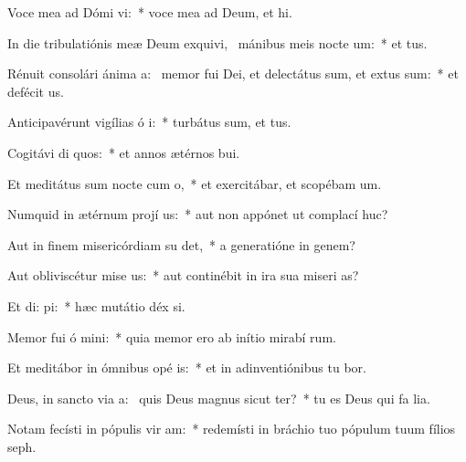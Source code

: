 \item Voce mea ad Dómi vi:~* voce mea ad Deum, et  hi.
\item In die tribulatiónis meæ Deum exquivi,~\pscross{} mánibus meis nocte  um:~* et   tus.
\item Rénuit consolári ánima a:~\pscross{} memor fui Dei, et delectátus sum, et extus sum:~* et defécit  us.
\item Anticipavérunt vigílias ó i:~* turbátus sum, et   tus.
\item Cogitávi di quos:~* et annos ætérnos   bui.
\item Et meditátus sum nocte cum  o,~* et exercitábar, et scopébam  um.
\item Numquid in ætérnum projí us:~* aut non appónet ut complací  huc?
\item Aut in finem misericórdiam su det,~* a generatióne in genem?
\item Aut obliviscétur mise us:~* aut continébit in ira sua miseri as?
\item Et di:  pi:~* hæc mutátio déx si.
\item Memor fui ó mini:~* quia memor ero ab inítio mirabí rum.
\item Et meditábor in ómnibus opé is:~* et in adinventiónibus tu bor.
\item Deus, in sancto via a:~\pscross{} quis Deus magnus sicut  ter?~* tu es Deus qui fa lia.
\item Notam fecísti in pópulis vir am:~* redemísti in bráchio tuo pópulum tuum fílios   seph.

